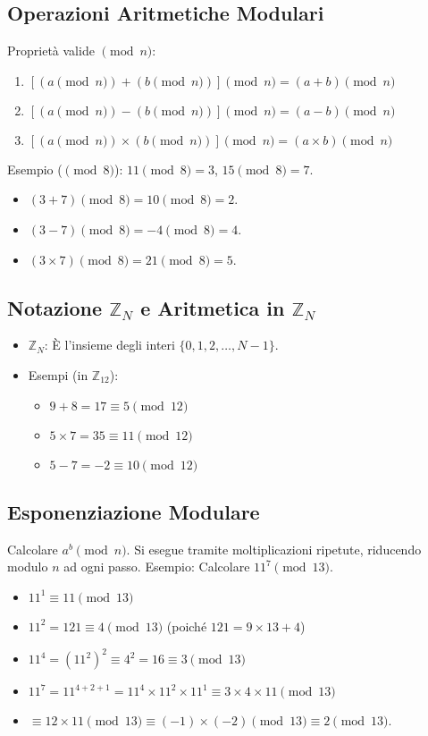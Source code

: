 \subsection{Operazioni Aritmetiche Modulari}
Proprietà valide $\pmod n$:
\begin{enumerate}
    \item $[(a \pmod n) + (b \pmod n)] \pmod n = (a + b) \pmod n$
    \item $[(a \pmod n) - (b \pmod n)] \pmod n = (a - b) \pmod n$
    \item $[(a \pmod n) \times (b \pmod n)] \pmod n = (a \times b) \pmod n$
\end{enumerate}
Esempio ($\pmod 8$): $11 \pmod 8 = 3$, $15 \pmod 8 = 7$.
\begin{itemize}
    \item $(3+7) \pmod 8 = 10 \pmod 8 = 2$.
    \item $(3-7) \pmod 8 = -4 \pmod 8 = 4$.
    \item $(3 \times 7) \pmod 8 = 21 \pmod 8 = 5$.
\end{itemize}

\subsection{Notazione $\mathbb{Z}_N$ e Aritmetica in $\mathbb{Z}_N$}
\begin{itemize}
    \item $\mathbb{Z}_N$: È l'insieme degli interi $\{0, 1, 2, \dots, N-1\}$.
    \item Esempi (in $\mathbb{Z}_{12}$):
    \begin{itemize}
        \item $9 + 8 = 17 \equiv 5 \pmod{12}$
        \item $5 \times 7 = 35 \equiv 11 \pmod{12}$
        \item $5 - 7 = -2 \equiv 10 \pmod{12}$
    \end{itemize}
\end{itemize}

\subsection{Esponenziazione Modulare}
Calcolare $a^b \pmod n$. Si esegue tramite moltiplicazioni ripetute, riducendo modulo $n$ ad ogni passo.
Esempio: Calcolare $11^7 \pmod{13}$.
\begin{itemize}
    \item $11^1 \equiv 11 \pmod{13}$
    \item $11^2 = 121 \equiv 4 \pmod{13}$ (poiché $121 = 9 \times 13 + 4$)
    \item $11^4 = (11^2)^2 \equiv 4^2 = 16 \equiv 3 \pmod{13}$
    \item $11^7 = 11^{4+2+1} = 11^4 \times 11^2 \times 11^1 \equiv 3 \times 4 \times 11 \pmod{13}$
    \item $\equiv 12 \times 11 \pmod{13} \equiv (-1) \times (-2) \pmod{13} \equiv 2 \pmod{13}$.
\end{itemize}

